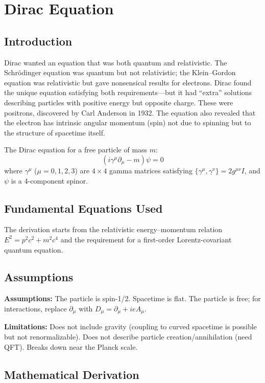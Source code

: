 \chapter{Dirac Equation}

\section*{Introduction}

Dirac wanted an equation that was both quantum and relativistic. The Schr\"odinger equation was quantum but not relativistic; the Klein--Gordon equation was relativistic but gave nonsensical results for electrons. Dirac found the unique equation satisfying both requirements---but it had ``extra'' solutions describing particles with positive energy but opposite charge. These were positrons, discovered by Carl Anderson in 1932. The equation also revealed that the electron has intrinsic angular momentum (spin) not due to spinning but to the structure of spacetime itself.


The Dirac equation for a free particle of mass $m$:
\[
(i\gamma^\mu \partial_\mu - m)\psi = 0
\]
where $\gamma^\mu$ ($\mu = 0,1,2,3$) are $4\times 4$ gamma matrices satisfying $\{\gamma^\mu, \gamma^\nu\} = 2g^{\mu\nu}I$, and $\psi$ is a 4-component spinor.

\section*{Fundamental Equations Used}

The derivation starts from the relativistic energy--momentum relation $E^2 = p^2 c^2 + m^2 c^4$ and the requirement for a first-order Lorentz-covariant quantum equation.

\section*{Assumptions}

\textbf{Assumptions:} The particle is spin-1/2. Spacetime is flat. The particle is free; for interactions, replace $\partial_\mu$ with $D_\mu = \partial_\mu + ieA_\mu$.


\textbf{Limitations:} Does not include gravity (coupling to curved spacetime is possible but not renormalizable). Does not describe particle creation/annihilation (need QFT). Breaks down near the Planck scale.


\section*{Mathematical Derivation}

